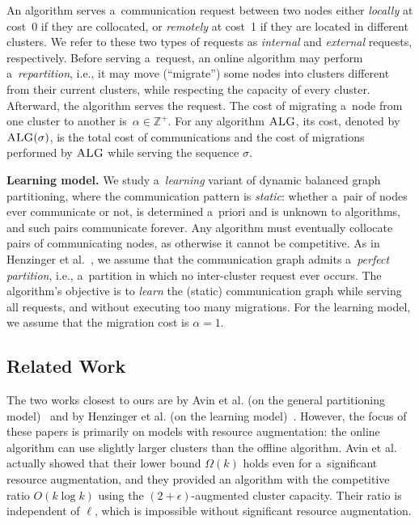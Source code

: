 \documentclass[a4paper,anonymous,USenglish]{lipics-v2019}
\newcommand{\ALG}{\textsc{ALG}\xspace}
\begin{document}
An algorithm serves a~communication request between two nodes
either \emph{locally} at cost~0
if they are collocated,
or \emph{remotely} at cost~1
if they are located in different clusters.
We refer to these two types of requests as \emph{internal}
and \emph{external} requests, respectively.
Before serving a~request,
an online algorithm may perform a~\emph{repartition},
i.e.,
it may move (``migrate'') some nodes into clusters different from their current clusters, while respecting the capacity of every cluster. 
Afterward, 
the algorithm serves the  request.
The cost of migrating a~node from one cluster to another
is~$\alpha \in \mathbb{Z}^+$.
For any algorithm $\ALG$,
its cost,
denoted by $\ALG(\sigma)$,
is the total cost of communications and
the cost of migrations performed by $\ALG$ while serving the sequence $\sigma$.



\noindent
\textbf{Learning model.}
We study a~\emph{learning} variant of dynamic balanced graph partitioning,
where the communication pattern is \emph{static}:
whether a~pair of  nodes ever communicate or not, 
is determined a~priori and is unknown to algorithms,
 and such pairs communicate forever.
Any algorithm must eventually collocate  pairs of communicating nodes,
as otherwise it cannot be competitive.
As in Henzinger et al.~\cite{sigmetrics19_partitioning}, we assume that the communication graph admits a~\emph{perfect partition},
i.e., a~partition in which no inter-cluster request ever occurs.
The algorithm's objective is to \emph{learn} the (static) communication graph
 while serving all requests,
and without executing too many migrations.
For the learning model, we  assume that the migration cost is $\alpha=1$.


\subsection{Related Work}

The two works closest to ours are by Avin et al. (on the general partitioning model)~\cite{repartition-disc, sidma-arxiv} and by Henzinger et al. (on the learning model)~\cite{sigmetrics19_partitioning}.
However, the focus of these papers is primarily on models with resource augmentation: the online algorithm can use slightly larger clusters than the offline algorithm.  
Avin et al. actually showed that their lower bound $\Omega(k)$ holds even for a~significant resource augmentation, and they provided an algorithm with the competitive ratio $O(k \log k)$ using the $(2+\epsilon)$-augmented cluster capacity.
Their ratio is independent of $\ell$, which is impossible without significant resource augmentation.
\end{document}
